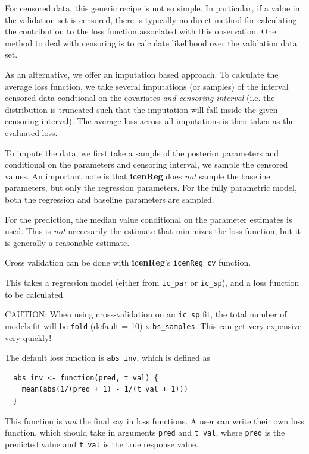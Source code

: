 \documentclass[11pt]{report}
\begin{document}
  For censored data, this generic recipe is not so simple. In particular, if 
  a value in the validation set is censored, there is typically no direct
  method for calculating the contribution to the loss function 
  associated with this observation. One method to deal with censoring is to calculate
  likelihood over the validation data set. 
  
  As an alternative, we offer an imputation based approach. To calculate the
  average loss function, we take several imputations (or samples) of the 
  interval censored data condtional on the covariates \emph{and censoring interval}
  (i.e. the distribution is truncated such that the imputation will fall inside the
  given censoring interval). The average loss across all imputations is then taken
  as the evaluated loss. 
  
  To impute the data, we first take a sample of the posterior parameters and conditional
  on the parameters and censoring interval, we sample the censored values. An important
  note is that {\bf icenReg} does \emph{not} sample the baseline parameters, but only
  the regression parameters. For the fully parametric model, both the regression and
  baseline parameters are sampled.

  For the prediction, the median value conditional on the parameter estimates is used. 
  This is \emph{not} neccesarily the estimate that minimizes the loss function, but it 
  is generally a reasonable estimate. 
  
  Cross validation can be done with {\bf icenReg}'s \texttt{icenReg\_cv} function. 
  
  This takes a regression model (either from \texttt{ic\_par} or \texttt{ic\_sp}), and a
  loss function to be calculated.
  
  CAUTION: When using cross-validation on an \texttt{ic\_sp} fit, the total number of 
  models fit will be \texttt{fold} (default = 10) x \texttt{bs\_samples}. This can get
  very expensive very quickly!
  
  The default loss function is \texttt{abs\_inv}, which is 
  defined as 
  
  \begin{verbatim}
  abs_inv <- function(pred, t_val) {
    mean(abs(1/(pred + 1) - 1/(t_val + 1)))
  }
  \end{verbatim}

  This function is \emph{not} the final say in loss functions. 
  A user can write their own loss function, which should take in arguments
  \texttt{pred} and \texttt{t\_val}, where \texttt{pred} is the predicted
  value and \texttt{t\_val} is the true response value. 
  
\end{document}
